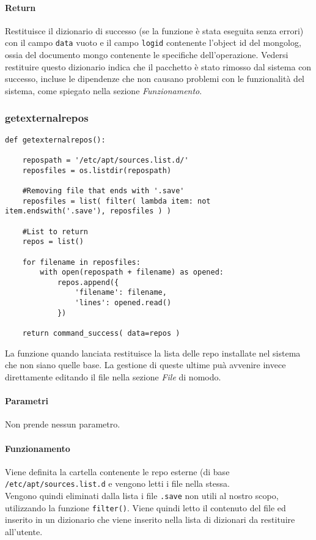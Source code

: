 \documentclass[11pt]{article}
\begin{document}
\paragraph{Return}
Restituisce il dizionario di successo (se la funzione è stata eseguita senza errori) con il campo \texttt{data} vuoto
e il campo \texttt{logid} contenente l'object id del mongolog, ossia del documento mongo contenente le specifiche
dell'operazione. Vedersi restituire questo dizionario indica che il pacchetto è stato rimosso dal sistema
con successo, incluse le dipendenze che non causano problemi con le funzionalità del sistema, come spiegato
nella sezione \textit{Funzionamento}.

\subsubsection{getexternalrepos}\label{getexternalrepos}
\begin{lstlisting}
def getexternalrepos():

    repospath = '/etc/apt/sources.list.d/'
    reposfiles = os.listdir(repospath)

    #Removing file that ends with '.save'
    reposfiles = list( filter( lambda item: not item.endswith('.save'), reposfiles ) )

    #List to return
    repos = list()

    for filename in reposfiles:
        with open(repospath + filename) as opened:
            repos.append({
                'filename': filename,
                'lines': opened.read()
            })

    return command_success( data=repos )
\end{lstlisting}
La funzione quando lanciata restituisce la lista delle repo installate nel sistema che non siano quelle base. La gestione
di queste ultime puà avvenire invece direttamente editando il file nella sezione \textit{File} di nomodo.
\paragraph{Parametri}
Non prende nessun parametro.
\paragraph{Funzionamento}
Viene definita la cartella contenente le repo esterne (di base \texttt{/etc/apt/sources.list.d} e vengono letti i file
nella stessa.\\
Vengono quindi eliminati dalla lista i file \texttt{.save} non utili al nostro scopo, utilizzando la funzione \texttt{filter()}.
Viene quindi letto il contenuto del file ed inserito in un dizionario che viene inserito nella lista di dizionari da restituire
all'utente.
\end{document}
